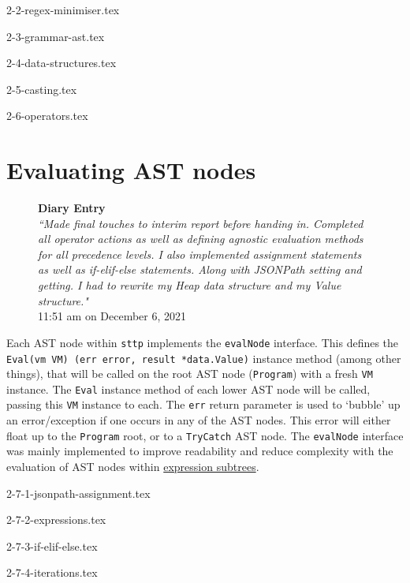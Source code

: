 \documentclass[]{full}
\theoremstyle{definition}
\begin{document}
{2-2-regex-minimiser.tex}

{2-3-grammar-ast.tex}

{2-4-data-structures.tex}

{2-5-casting.tex}

{2-6-operators.tex}

\section{Evaluating AST nodes}

\begin{figure}[H]
    \begin{center}
        \textbf{Diary Entry}\\[0.5em]
        \textit{``Made final touches to interim report before handing in. Completed all operator actions as well as defining agnostic evaluation methods for all precedence levels. I also implemented assignment statements as well as if-elif-else statements. Along with JSONPath setting and getting. I had to rewrite my Heap data structure and my Value structure."}\\[0.5em]
        \tiny{11:51 am on December 6, 2021}
    \end{center}
\end{figure}
    
Each AST node within \verb|sttp| implements the \verb|evalNode| interface. This defines the \texttt{Eval(vm VM) (err error, result *data.Value)} instance method (among other things), that will be called on the root AST node (\verb|Program|) with a fresh \verb|VM| instance. The \verb|Eval| instance method of each lower AST node will be called, passing this \verb|VM| instance to each. The \verb|err| return parameter is used to `bubble' up an error/exception if one occurs in any of the AST nodes. This error will either float up to the \verb|Program| root, or to a \verb|TryCatch| AST node. The \verb|evalNode| interface was mainly implemented to improve readability and reduce complexity with the evaluation of AST nodes within \hyperref[sec:development-ast-nodes-expressions]{expression subtrees}.

{2-7-1-jsonpath-assignment.tex}

{2-7-2-expressions.tex}

{2-7-3-if-elif-else.tex}

{2-7-4-iterations.tex}
\end{document}
